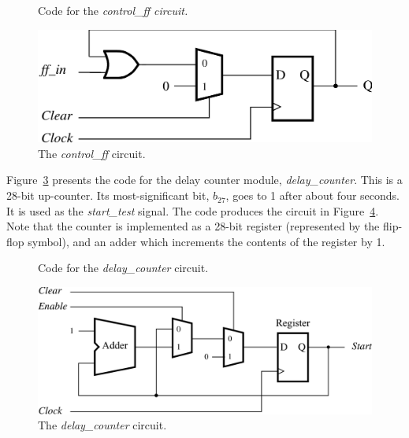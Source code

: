\documentclass[11pt, twoside, pdftex]{article}
\begin{document}
\begin{figure}[H]

	\caption{Code for the \it{control\_ff} circuit.}
	\label{fig:3}
\end{figure}

\begin{figure}[H]
   \begin{center}
      \includegraphics[scale=1]{figures/figure4.png}
   \caption{The {\it control\_ff} circuit.} 
	 \label{fig:4}
	 \end{center}
\end{figure}

Figure~\ref{fig:5} presents the code for the delay counter module, {\it delay\_counter}.
This is a 28-bit up-counter. Its most-significant bit, $b_{27}$,
goes to 1 after about four seconds. It is used as the {\it start\_test} signal.
The code produces the circuit in Figure~\ref{fig:6}. Note that the
counter is implemented as a 28-bit register (represented by the flip-flop symbol),
and an adder which increments the contents of the register by 1.

\begin{figure}[H]

	\caption{Code for the {\it delay\_counter} circuit.}
	\label{fig:5}
\end{figure}
 
\begin{figure}[H]
   \begin{center}
      \includegraphics[scale=0.9]{figures/figure6.png}
   \caption{The {\it delay\_counter} circuit.} 
	 \label{fig:6}
	 \end{center}
\end{figure}
\end{document}
